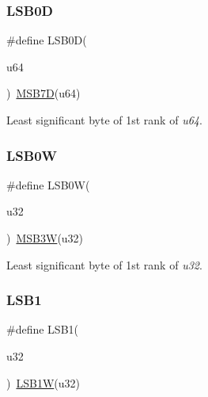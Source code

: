 \subsubsection{\texorpdfstring{LSB0D}{LSB0D}}
{\footnotesize\ttfamily \#define L\+S\+B0D(\begin{DoxyParamCaption}\item[{}]{u64 }\end{DoxyParamCaption})~\mbox{\hyperlink{group__group__sam0__utils_ga0cbce69964fa2dd7bf05911d0b99b014}{M\+S\+B7D}}(u64)}



Least significant byte of 1st rank of {\itshape u64}. 

\mbox{\label{group__group__sam0__utils_ga2ca8582260a8ada6cdd457cf37ba37a7}} 
\subsubsection{\texorpdfstring{LSB0W}{LSB0W}}
{\footnotesize\ttfamily \#define L\+S\+B0W(\begin{DoxyParamCaption}\item[{}]{u32 }\end{DoxyParamCaption})~\mbox{\hyperlink{group__group__sam0__utils_gad6ab5ac6e3e95525d56d757c9718e352}{M\+S\+B3W}}(u32)}



Least significant byte of 1st rank of {\itshape u32}. 

\mbox{\label{group__group__sam0__utils_ga2d1e45154b07481f0579ecc725e4edff}} 
\subsubsection{\texorpdfstring{LSB1}{LSB1}}
{\footnotesize\ttfamily \#define L\+S\+B1(\begin{DoxyParamCaption}\item[{}]{u32 }\end{DoxyParamCaption})~\mbox{\hyperlink{group__group__sam0__utils_ga84cbbcad1971cdb2987418e6ae6cb4ff}{L\+S\+B1W}}(u32)}



